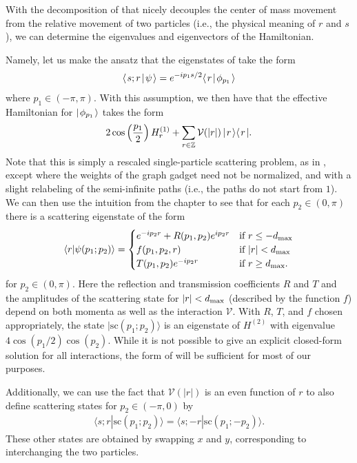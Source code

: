 \documentclass[../thesis-main/thesis-main]{subfiles}
\begin{document}
With the decomposition of  that nicely decouples the center of mass movement from the relative movement of two particles (i.e., the physical meaning of $r$ and $s$), we can determine the eigenvalues and eigenvectors of the Hamiltonian.  

Namely, let us make the ansatz that the eigenstates of  take the form
\begin{align}
  \langle\mspace{2mu} s;r \mspace{2mu} | \mspace{2mu} \psi\mspace{2mu} \rangle = e^{ - i p_1 s/2} \langle\mspace{2mu} r \mspace{2mu} | \mspace{2mu} \phi_{p_1}\mspace{2mu} \rangle
\end{align}
where $p_1 \in (-\pi,\pi)$.  With this assumption, we then have that the effective Hamiltonian for $|\mspace{2mu} \phi_{p_1} \mspace{2mu} \rangle$ takes the form
\begin{equation}
 2\cos\left(\frac{p_1}{2}\right) H^{(1)}_r + \sum_{r\in \mathbb{Z}} \mathcal{V}(|r|) \, |\mspace{2mu} r \mspace{2mu} \rangle\langle\mspace{2mu} r \mspace{2mu} |.\label{eq:vr_eqn}
\end{equation}
Note that this is simply a rescaled single-particle scattering problem, as in , except where the weights of the graph gadget need not be normalized, and with a slight relabeling of the semi-infinite paths (i.e., the paths do not start from $1$).   We can then use the intuition from the chapter to see that for each $p_2\in (0,\pi)$ there is a scattering eigenstate of the form
\begin{equation}
\langle r|\psi (p_1;p_2)\rangle= \begin{cases}  e^{-i p_2 r} + R(p_1,p_2) e^{i p_2 r} &  \text{if } r \leq -d_{\text{max}}\\
  	f(p_1,p_2,r) &  \text{if } |r| < d_{\text{max}}\\
  	T(p_1,p_2) e^{- i p_2 r}  & \text{if } r \geq d_{\text{max}}.\end{cases}
\label{eq:psip1p2}
\end{equation}
for $p_2\in (0,\pi)$. Here the reflection and transmission coefficients $R$ and $T$ and the amplitudes of the scattering state for $|r|<d_{\text{max}}$ (described by the function $f$) depend on both momenta as well as the interaction $\mathcal{V}$.  With $R$, $T$, and $f$ chosen appropriately, the state $|\mathrm{sc}(p_1;p_2)\rangle$ is an eigenstate of $H^{(2)}$ with eigenvalue $4\cos(p_1/2)\cos(p_2)$.  While it is not possible to give an explicit closed-form solution for all interactions, the form of  will be sufficient for most of our purposes.

Additionally, we can use the fact that $\mathcal{V}(|r|)$ is an even function of $r$ to also define scattering states for $p_2\in (-\pi,0)$ by
\begin{align}
  \langle s;r|\mathrm{sc}(p_1;p_2)\rangle=\langle s;-r|\mathrm{sc}(p_1;-p_2)\rangle.
\end{align}
These other states are obtained by swapping $x$ and $y$, corresponding to interchanging the two particles.
\end{document}
